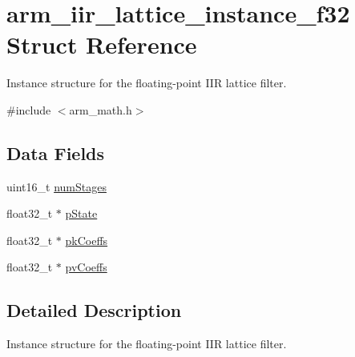 \hypertarget{structarm__iir__lattice__instance__f32}{\section{arm\-\_\-iir\-\_\-lattice\-\_\-instance\-\_\-f32 Struct Reference}
\label{structarm__iir__lattice__instance__f32}
}


Instance structure for the floating-\/point I\-I\-R lattice filter.  




{\ttfamily \#include $<$arm\-\_\-math.\-h$>$}

\subsection*{Data Fields}
\begin{DoxyCompactItemize}
\item 
uint16\-\_\-t \hyperlink{structarm__iir__lattice__instance__f32_a4cceb90547b3e585d4c7aabaa8057212}{num\-Stages}
\item 
float32\-\_\-t $\ast$ \hyperlink{structarm__iir__lattice__instance__f32_a335c87e6fdc4b96601d95a5de8b9c463}{p\-State}
\item 
float32\-\_\-t $\ast$ \hyperlink{structarm__iir__lattice__instance__f32_a994889c5c4a866c50a0ee63326378816}{pk\-Coeffs}
\item 
float32\-\_\-t $\ast$ \hyperlink{structarm__iir__lattice__instance__f32_a0f8815744fade9c580d44277ff802308}{pv\-Coeffs}
\end{DoxyCompactItemize}


\subsection{Detailed Description}
Instance structure for the floating-\/point I\-I\-R lattice filter. 

